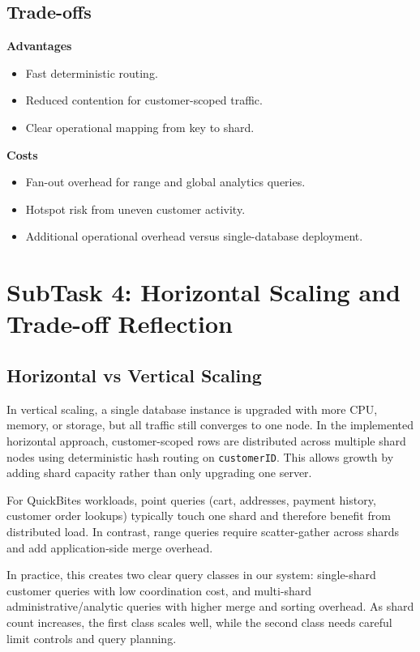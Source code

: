 \documentclass[12pt,a4paper]{article}
\begin{document}
\subsection{Trade-offs}

\textbf{Advantages}
\begin{itemize}[leftmargin=*]
  \item Fast deterministic routing.
  \item Reduced contention for customer-scoped traffic.
  \item Clear operational mapping from key to shard.
\end{itemize}

\textbf{Costs}
\begin{itemize}[leftmargin=*]
  \item Fan-out overhead for range and global analytics queries.
  \item Hotspot risk from uneven customer activity.
  \item Additional operational overhead versus single-database deployment.
\end{itemize}

\section{SubTask 4: Horizontal Scaling and Trade-off Reflection}

\subsection{Horizontal vs Vertical Scaling}

In vertical scaling, a single database instance is upgraded with more CPU, memory,
or storage, but all traffic still converges to one node. In the implemented
horizontal approach, customer-scoped rows are distributed across multiple shard
nodes using deterministic hash routing on \texttt{customerID}. This allows growth
by adding shard capacity rather than only upgrading one server.

For QuickBites workloads, point queries (cart, addresses, payment history, customer
order lookups) typically touch one shard and therefore benefit from distributed
load. In contrast, range queries require scatter-gather across shards and add
application-side merge overhead.

In practice, this creates two clear query classes in our system:
single-shard customer queries with low coordination cost, and multi-shard
administrative/analytic queries with higher merge and sorting overhead.
As shard count increases, the first class scales well, while the second class
needs careful limit controls and query planning.
\end{document}
